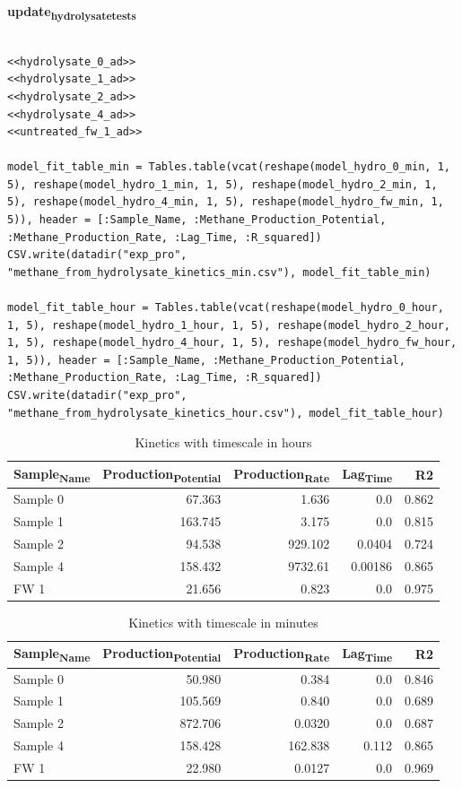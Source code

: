 \documentclass[11pt]{article}
\begin{document}
\textbf{update\textsubscript{hydrolysate}\textsubscript{tests}}
\begin{verbatim}

<<hydrolysate_0_ad>>
<<hydrolysate_1_ad>>
<<hydrolysate_2_ad>>
<<hydrolysate_4_ad>>
<<untreated_fw_1_ad>>

model_fit_table_min = Tables.table(vcat(reshape(model_hydro_0_min, 1, 5), reshape(model_hydro_1_min, 1, 5), reshape(model_hydro_2_min, 1, 5), reshape(model_hydro_4_min, 1, 5), reshape(model_hydro_fw_min, 1, 5)), header = [:Sample_Name, :Methane_Production_Potential, :Methane_Production_Rate, :Lag_Time, :R_squared])
CSV.write(datadir("exp_pro", "methane_from_hydrolysate_kinetics_min.csv"), model_fit_table_min)

model_fit_table_hour = Tables.table(vcat(reshape(model_hydro_0_hour, 1, 5), reshape(model_hydro_1_hour, 1, 5), reshape(model_hydro_2_hour, 1, 5), reshape(model_hydro_4_hour, 1, 5), reshape(model_hydro_fw_hour, 1, 5)), header = [:Sample_Name, :Methane_Production_Potential, :Methane_Production_Rate, :Lag_Time, :R_squared])
CSV.write(datadir("exp_pro", "methane_from_hydrolysate_kinetics_hour.csv"), model_fit_table_hour)
\end{verbatim}

\begin{table}[htbp]
\caption{Kinetics with timescale in hours}
\centering
\begin{tabular}{lrrrr}
Sample\textsubscript{Name} & Production\textsubscript{Potential} & Production\textsubscript{Rate} & Lag\textsubscript{Time} & R2\\[0pt]
\hline
Sample 0 & 67.363 & 1.636 & 0.0 & 0.862\\[0pt]
Sample 1 & 163.745 & 3.175 & 0.0 & 0.815\\[0pt]
Sample 2 & 94.538 & 929.102 & 0.0404 & 0.724\\[0pt]
Sample 4 & 158.432 & 9732.61 & 0.00186 & 0.865\\[0pt]
FW 1 & 21.656 & 0.823 & 0.0 & 0.975\\[0pt]
\end{tabular}
\end{table}

\begin{table}[htbp]
\caption{Kinetics with timescale in minutes}
\centering
\begin{tabular}{lrrrr}
Sample\textsubscript{Name} & Production\textsubscript{Potential} & Production\textsubscript{Rate} & Lag\textsubscript{Time} & R2\\[0pt]
\hline
Sample 0 & 50.980 & 0.384 & 0.0 & 0.846\\[0pt]
Sample 1 & 105.569 & 0.840 & 0.0 & 0.689\\[0pt]
Sample 2 & 872.706 & 0.0320 & 0.0 & 0.687\\[0pt]
Sample 4 & 158.428 & 162.838 & 0.112 & 0.865\\[0pt]
FW 1 & 22.980 & 0.0127 & 0.0 & 0.969\\[0pt]
\end{tabular}
\end{table}
\end{document}
